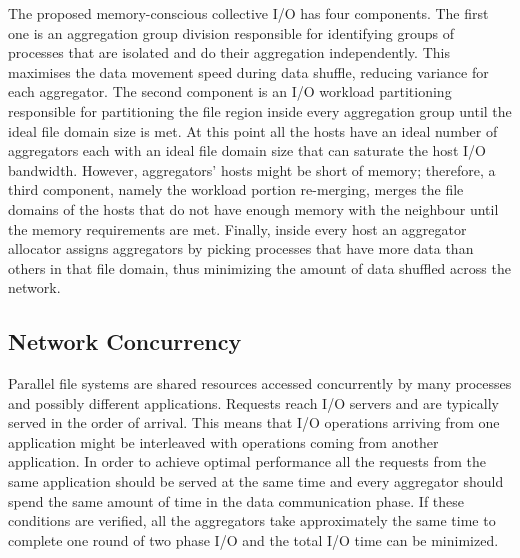 The proposed memory-conscious collective I/O has four components. The first one is an aggregation group division responsible for identifying groups of processes that are isolated and do their aggregation 
independently. This maximises the data movement speed during data shuffle, reducing variance for each aggregator. The second component is an I/O workload partitioning responsible for partitioning the file 
region inside every aggregation group until the ideal file domain size is met. At this point all the hosts have an ideal number of aggregators each with an ideal file domain size that can saturate the host 
I/O bandwidth. However, aggregators' hosts might be short of memory; therefore, a third component, namely the workload portion re-merging, merges the file domains of the hosts that do not have enough memory 
with the neighbour until the memory requirements are met. Finally, inside every host an aggregator allocator assigns aggregators by picking processes that have more data than others in that file domain, 
thus minimizing the amount of data shuffled across the network.

\subsection{Network Concurrency}
Parallel file systems are shared resources accessed concurrently by many processes and possibly different applications. Requests reach I/O servers and are typically served in the order of arrival. This 
means that I/O operations arriving from one application might be interleaved with operations coming from another application. In order to achieve optimal performance all the requests from the same application 
should be served at the same time and every aggregator should spend the same amount of time in the data communication phase. If these conditions are verified, all the aggregators take approximately the same 
time to complete one round of two phase I/O and the total I/O time can be minimized.

